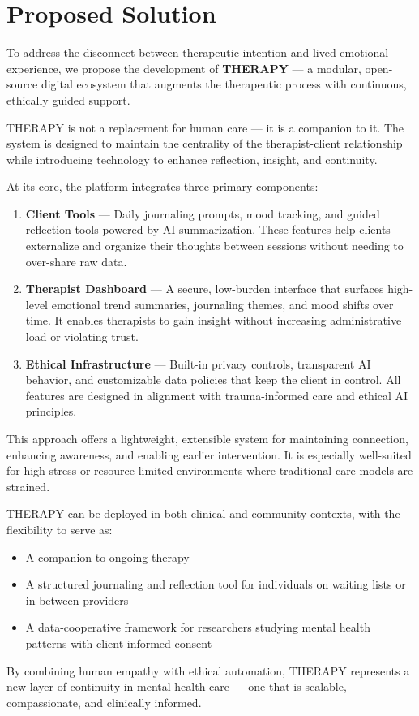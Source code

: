 \section*{Proposed Solution}

To address the disconnect between therapeutic intention and lived emotional experience, we propose the development of \textbf{THERAPY} — a modular, open-source digital ecosystem that augments the therapeutic process with continuous, ethically guided support.

THERAPY is not a replacement for human care — it is a companion to it. The system is designed to maintain the centrality of the therapist-client relationship while introducing technology to enhance reflection, insight, and continuity.

At its core, the platform integrates three primary components:

\begin{enumerate}
  \item \textbf{Client Tools} — Daily journaling prompts, mood tracking, and guided reflection tools powered by AI summarization. These features help clients externalize and organize their thoughts between sessions without needing to over-share raw data.
  
  \item \textbf{Therapist Dashboard} — A secure, low-burden interface that surfaces high-level emotional trend summaries, journaling themes, and mood shifts over time. It enables therapists to gain insight without increasing administrative load or violating trust.
  
  \item \textbf{Ethical Infrastructure} — Built-in privacy controls, transparent AI behavior, and customizable data policies that keep the client in control. All features are designed in alignment with trauma-informed care and ethical AI principles.
\end{enumerate}

This approach offers a lightweight, extensible system for maintaining connection, enhancing awareness, and enabling earlier intervention. It is especially well-suited for high-stress or resource-limited environments where traditional care models are strained.

THERAPY can be deployed in both clinical and community contexts, with the flexibility to serve as:

\begin{itemize}
  \item A companion to ongoing therapy
  \item A structured journaling and reflection tool for individuals on waiting lists or in between providers
  \item A data-cooperative framework for researchers studying mental health patterns with client-informed consent
\end{itemize}

By combining human empathy with ethical automation, THERAPY represents a new layer of continuity in mental health care — one that is scalable, compassionate, and clinically informed.
